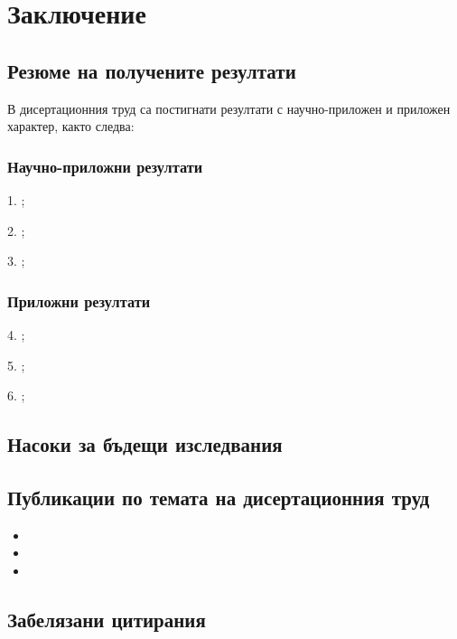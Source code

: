 \chapter*{Заключение}

\section*{Резюме на получените резултати}

В дисертационния труд са постигнати резултати с научно-приложен и приложен характер, както следва:

\subsection*{Научно-приложни резултати}

\begin{description}
\item 1. ;
\item 2. ;
\item 3. ;
\end{description}

\subsection*{Приложни резултати}

\begin{description}
\item 4. ;
\item 5. ;
\item 6. ;
\end{description}

\section*{Насоки за бъдещи изследвания}

\section*{Публикации по темата на дисертационния труд}

\begin{itemize}
\item
\item
\item
\end{itemize}

\section*{Забелязани цитирания}


